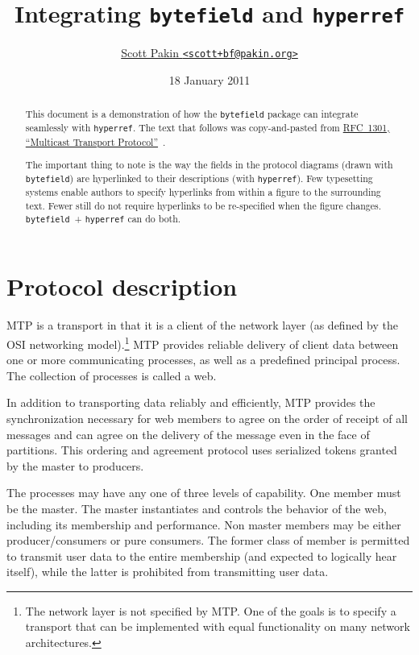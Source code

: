 \documentclass[11pt]{article}
\title{Integrating \texttt{bytefield} and \texttt{hyperref}}
\author{\href{http://www.pakin.org/~scott}{Scott Pakin 
  \texttt{<scott+bf@pakin.org>}}}
\date{18 January 2011}
\begin{document}
\sloppy
\maketitle

\begin{abstract}
This document is a demonstration of how the \texttt{bytefield} package can
integrate seamlessly with \texttt{hyperref}.  The text that follows was
copy-and-pasted from
\href{http://www.rfc-editor.org/rfc/rfc1301.txt}{RFC~1301, ``Multicast
Transport Protocol''}~\cite{Armstrong92}.

The important thing to note is the way the fields in the protocol diagrams
(drawn with \texttt{bytefield}) are hyperlinked to their descriptions (with
\texttt{hyperref}).  Few typesetting systems enable authors to specify
hyperlinks from within a figure to the surrounding text.  Fewer still do
not require hyperlinks to be re-specified when the figure changes.
\texttt{bytefield}~+ \texttt{hyperref} can do both.
\end{abstract}


\setcounter{section}{1}

\section{Protocol description}

   MTP is a transport in that it is a client of the network layer (as
   defined by the OSI networking model).\footnote{The network layer is not
   specified by MTP. One of the goals is to specify a transport that can be
   implemented with equal functionality on many network architectures.}
   MTP provides reliable delivery of client data between one or more
   communicating processes, as well as a predefined principal process. The
   collection of processes is called a web.

   In addition to transporting data reliably and efficiently, MTP
   provides the synchronization necessary for web members to agree on
   the order of receipt of all messages and can agree on the delivery of
   the message even in the face of partitions.  This ordering and
   agreement protocol uses serialized tokens granted by the master to
   producers.

   The processes may have any one of three levels of capability. One
   member must be the master. The master instantiates and controls the
   behavior of the web, including its membership and performance. Non
   master members may be either producer/consumers or pure consumers.
   The former class of member is permitted to transmit user data to the
   entire membership (and expected to logically hear itself), while the
   latter is prohibited from transmitting user data.
\end{document}

